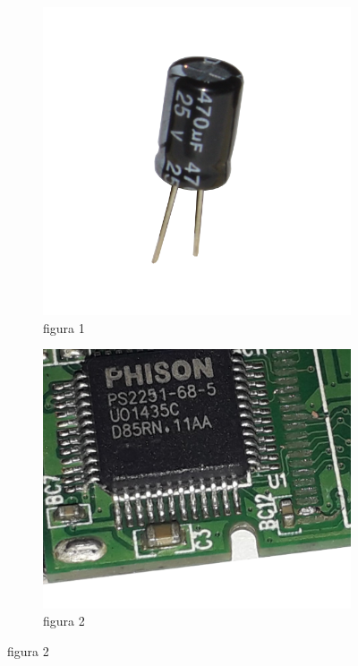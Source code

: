 \documentclass[12pt]{article}
\begin{document}
\begin{figure}[h!]
  \centering
  \begin{subfigure}[b]{0.25\linewidth}
    \includegraphics[width=\linewidth]{data/condensatore-reale.jpg}
    \caption*{figura 1}
  \end{subfigure}
  \begin{subfigure}[b]{0.25\linewidth}
    \includegraphics[width=\linewidth]{data/PCB-capacitor.png}
    \caption*{figura 2}
  \end{subfigure}
  

\end{figure}
\end{document}
